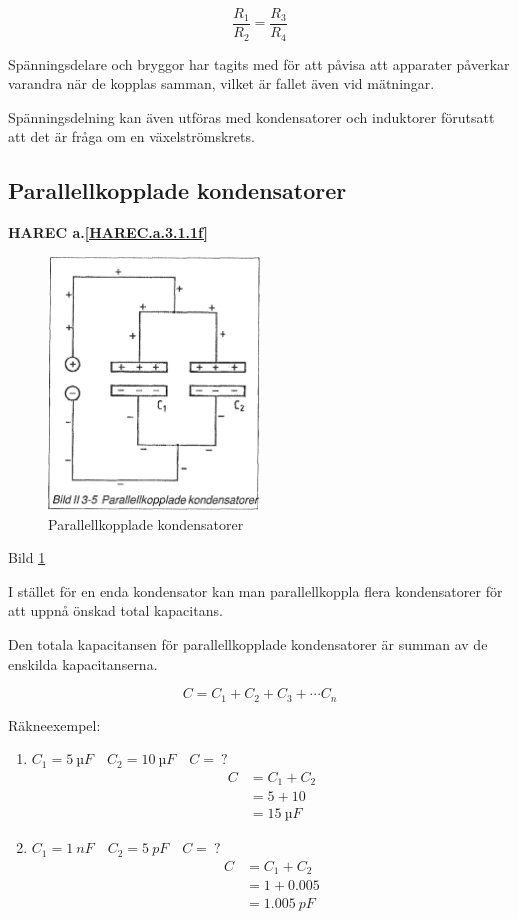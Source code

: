 \[\frac{R_1}{R_2} = \frac{R_3}{R_4}\]

Spänningsdelare och bryggor har tagits med för att påvisa att apparater påverkar
varandra när de kopplas samman, vilket är fallet även vid mätningar.

Spänningsdelning kan även utföras med kondensatorer och induktorer förutsatt att
det är fråga om en växelströmskrets.

\subsection{Parallellkopplade kondensatorer}
\textbf{HAREC a.\ref{HAREC.a.3.1.1f}\label{myHAREC.a.3.1.1f}}

\begin{figure}
\includegraphics[width=0.5\textwidth]{images/bild_2_3-05}
\caption{Parallellkopplade kondensatorer}
\label{fig:BildII3-05}
\end{figure}

Bild \ref{fig:BildII3-05}

I stället för en enda kondensator kan man parallellkoppla flera kondensatorer
för att uppnå önskad total kapacitans.

Den totala kapacitansen för parallellkopplade kondensatorer är summan av de
enskilda kapacitanserna.

\[C = C_1 + C_2 + C_3 + \cdots C_n\]

Räkneexempel:
\begin{enumerate}
\item \(C_1 = 5\ µF \quad C_2 = 10\ µF \quad C =\ ?\)
  \begin{align*}
    C &= C_1 + C_2 \\
    &= 5 + 10 \\
    &= 15\ µF
  \end{align*}
\item \(C_1 = 1\ nF \quad C_2 = 5\ pF \quad C =\ ?\)
  \begin{align*}
    C &= C_1 + C_2 \\
    &= 1 + 0.005 \\
    &= 1.005\ pF
  \end{align*}
\end{enumerate}


